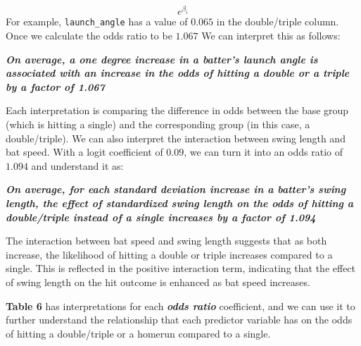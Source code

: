 \documentclass[
  letterpaper,
  DIV=11,
  numbers=noendperiod]{scrartcl}
\begin{document}
\[e^{\beta_i}\] For example, \texttt{launch\_angle} has a value of
\(0.065\) in the double/triple column. Once we calculate the odds ratio
to be \(1.067\) We can interpret this as follows:

\textbf{\emph{On average, a one degree increase in a batter's launch
angle is associated with an increase in the odds of hitting a double or
a triple by a factor of 1.067}}

Each interpretation is comparing the difference in odds between the base
group (which is hitting a single) and the corresponding group (in this
case, a double/triple). We can also interpret the interaction between
swing length and bat speed. With a logit coefficient of \(0.09\), we can
turn it into an odds ratio of \(1.094\) and understand it as:

\textbf{\emph{On average, for each standard deviation increase in a
batter's swing length, the effect of standardized swing length on the
odds of hitting a double/triple instead of a single increases by a
factor of 1.094}}

The interaction between bat speed and swing length suggests that as both
increase, the likelihood of hitting a double or triple increases
compared to a single. This is reflected in the positive interaction
term, indicating that the effect of swing length on the hit outcome is
enhanced as bat speed increases.

\textbf{Table 6} has interpretations for each \textbf{\emph{odds ratio}}
coefficient, and we can use it to further understand the relationship
that each predictor variable has on the odds of hitting a double/triple
or a homerun compared to a single.

\newpage
\end{document}
